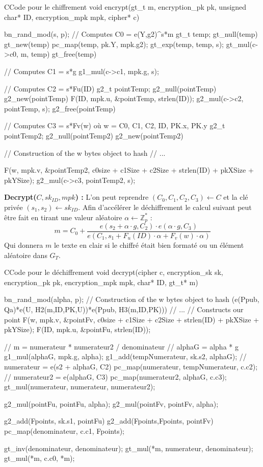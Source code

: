 \begin{sourcebox}{C}{Code pour le chiffrement}
	void encrypt(gt_t m, encryption_pk pk, unsigned char* ID, encryption_mpk mpk, cipher* c){
		bn_rand_mod(s, p);
		// Computes C0 = e(Y,g2)^s*m
		gt_t temp;
		gt_null(temp)
		gt_new(temp)
		pc_map(temp, pk.Y, mpk.g2);
		gt_exp(temp, temp, s);
		gt_mul(c->c0, m, temp)
		gt_free(temp)
		
		// Computes C1 = s*g
		g1_mul(c->c1, mpk.g, s);
		
		// Computes C2 = s*Fu(ID)
		g2_t pointTemp;
		g2_null(pointTemp)
		g2_new(pointTemp)
		F(ID, mpk.u, &pointTemp, strlen(ID));
		g2_mul(c->c2, pointTemp, s);
		g2_free(pointTemp)
		
		// Computes C3 = s*Fv(w) où w = C0, C1, C2, ID, PK.x, PK.y
		g2_t pointTemp2;
		g2_null(pointTemp2)
		g2_new(pointTemp2)
		
		// Construction of the w bytes object to hash
		// ...
		
		F(w, mpk.v, &pointTemp2, c0size + c1Size + c2Size + strlen(ID) + pkXSize + pkYSize);
		g2_mul(c->c3, pointTemp2, s);
	}
\end{sourcebox}

\textbf{Decrypt($C, sk_{ID}, mpk$) :} L'on peut reprendre $(C_0,C_1,C_2,C_3) \leftarrow C$ et la clé privée $(s_1, s_2) \leftarrow sk_{ID}$. Afin d'accélérer le déchiffrement le calcul suivant peut être fait en tirant une valeur aléatoire $\alpha \leftarrow \mathbb{Z}_p^*$ :
\[m = C_0 + \frac{e(s_2 + \alpha \cdot g, C_2 ) \cdot e(\alpha \cdot g, C_3)}{e(C_1, s_1 + F_u(ID) \cdot \alpha + F_v(w) \cdot \alpha)}\]
Qui donnera $m$ le texte en clair si le chiffré était bien formaté ou un élément aléatoire dans $G_T$.

\begin{sourcebox}{C}{Code pour le déchiffrement}
	void decrypt(cipher c, encryption_sk sk, encryption_pk pk, encryption_mpk  mpk, char* ID, gt_t* m){
		bn_rand_mod(alpha, p);
		// Construction of the w bytes object to hash (e(Ppub, Qa)*e(U, H2(m,ID,PK,U))*e(Ppub, H3(m,ID,PK)))
		// ...
		// Constructs our point
		F(w, mpk.v, &pointFv, c0size + c1Size + c2Size + strlen(ID) + pkXSize + pkYSize);
		F(ID, mpk.u, &pointFu, strlen(ID));
		
		// m = numerateur * numerateur2 / denominateur
		// alphaG = alpha * g
		g1_mul(alphaG, mpk.g, alpha);
		g1_add(tempNumerateur, sk.s2, alphaG);
		// numerateur = e(s2 + alphaG, C2)
		pc_map(numerateur, tempNumerateur, c.c2);
		// numerateur2 = e(alphaG, C3)
		pc_map(numerateur2, alphaG, c.c3);
		gt_mul(numerateur, numerateur, numerateur2);
		
		g2_mul(pointFu, pointFu, alpha);
		g2_mul(pointFv, pointFv, alpha);
		
		g2_add(Fpoints, sk.s1, pointFu)
		g2_add(Fpoints,Fpoints, pointFv)
		pc_map(denominateur, c.c1, Fpoints);
		
		gt_inv(denominateur, denominateur);
		gt_mul(*m, numerateur, denominateur);
		gt_mul(*m, c.c0, *m);
	}
\end{sourcebox}

